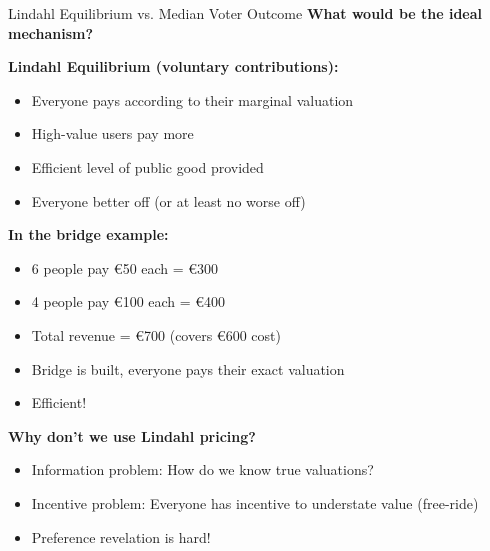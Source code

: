 \documentclass[10pt]{beamer}
\begin{document}
\begin{frame}[allowframebreaks]{Lindahl Equilibrium vs. Median Voter Outcome}
\textbf{What would be the ideal mechanism?}



\textbf{Lindahl Equilibrium (voluntary contributions):}
\begin{itemize}
\item Everyone pays according to their marginal valuation
\item High-value users pay more
\item Efficient level of public good provided
\item Everyone better off (or at least no worse off)
\end{itemize}



\textbf{In the bridge example:}
\begin{itemize}
\item 6 people pay €50 each = €300
\item 4 people pay €100 each = €400
\item Total revenue = €700 (covers €600 cost)
\item Bridge is built, everyone pays their exact valuation
\item \alert{Efficient!}
\end{itemize}
  \framebreak  


\textbf{Why don't we use Lindahl pricing?}
\begin{itemize}
\item Information problem: How do we know true valuations?
\item Incentive problem: Everyone has incentive to understate value (free-ride)
\item \alert{Preference revelation is hard!}
\end{itemize}
\end{frame}
\end{document}

